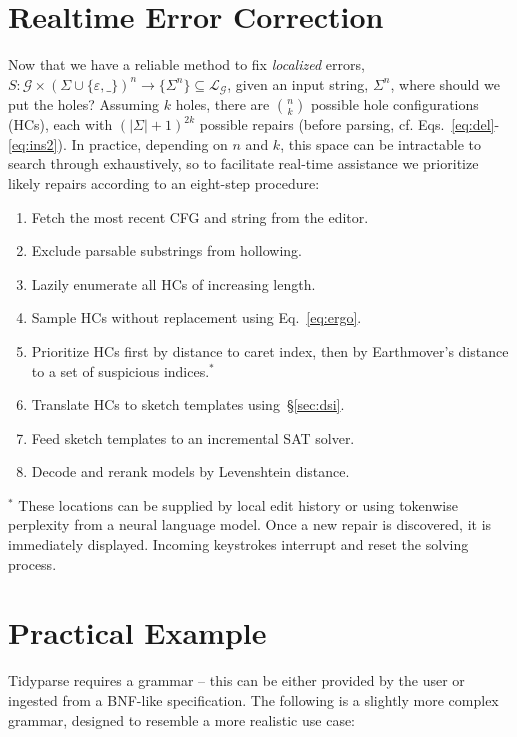 \documentclass[sigplan,review,anonymous,acmsmall]{acmart}\settopmatter{printfolios=false,printccs=false,printacmref=false}
\begin{document}
    \section{Realtime Error Correction}\label{sec:holes}

    Now that we have a reliable method to fix \textit{localized} errors, $S: \mathcal{G} \times (\Sigma\cup\{\varepsilon, \texttt{\_}\})^n \rightarrow \{\Sigma^n\}\subseteq \mathcal{L}_\mathcal{G}$, given an input string, $\Sigma^n$, where should we put the holes? Assuming $k$ holes, there are ${n \choose k}$ possible hole configurations (HCs), each with $(|\Sigma| + 1)^{2k}$ possible repairs (before parsing, cf. Eqs.~\ref{eq:del}-\ref{eq:ins2}). In practice, depending on $n$ and $k$, this space can be intractable to search through exhaustively, so to facilitate real-time assistance we prioritize likely repairs according to an eight-step procedure:

    \begin{enumerate}
        \item Fetch the most recent CFG and string from the editor.
        \item Exclude parsable substrings from hollowing.
        \item Lazily enumerate all HCs of increasing length.
        \item Sample HCs without replacement using Eq.~\ref{eq:ergo}.
        \item Prioritize HCs first by distance to caret index, then by Earthmover's distance to a set of suspicious indices.$^*$
        \item Translate HCs to sketch templates using~\S\ref{sec:dsi}.
        \item Feed sketch templates to an incremental SAT solver.
        \item Decode and rerank models by Levenshtein distance.
    \end{enumerate}

    \noindent $^*$ These locations can be supplied by local edit history or using tokenwise perplexity from a neural language model. Once a new repair is discovered, it is immediately displayed. Incoming keystrokes interrupt and reset the solving process.


    \section{Practical Example}

    Tidyparse requires a grammar -- this can be either provided by the user or ingested from a BNF-like specification. The following is a slightly more complex grammar, designed to resemble a more realistic use case:
\end{document}
